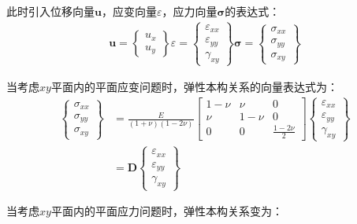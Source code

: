 此时引入位移向量$\pmb{u}$，应变向量$\varepsilon$，应力向量$\pmb{\sigma}$的表达式：
\begin{equation}
\begin{split}
    \pmb{u}=\left\{\begin{matrix} u_x\\u_y\end{matrix}\right\}
    \varepsilon=\left\{\begin{matrix}
        \varepsilon_{xx}\\\varepsilon_{yy}\\\gamma_{xy}
    \end{matrix}\right\}
    \pmb{\sigma}=\left\{\begin{matrix}
        \sigma_{xx}\\\sigma_{yy}\\\sigma_{xy}
    \end{matrix}\right\}
\end{split}
\end{equation}\par
当考虑$xy$平面内的平面应变问题时，弹性本构关系的向量表达式为：
\begin{equation}
\begin{split}
    \left\{\begin{matrix}
        \sigma_{xx}\\\sigma_{yy}\\\sigma_{xy}
    \end{matrix}\right\}&=\frac{E}{(1+\nu)(1-2\nu)}
    \left[\begin{matrix}
        1-\nu&\nu&0\\\nu&1-\nu&0\\0&0&\frac{1-2\nu}{2}
    \end{matrix}\right]
    \left\{\begin{matrix}
        \varepsilon_{xx}\\\varepsilon_{yy}\\\gamma_{xy}
    \end{matrix}\right\}\\
    &=\pmb{D}\left\{\begin{matrix}\varepsilon_{xx}\\\varepsilon_{yy}\\\gamma_{xy}\end{matrix}\right\}
\end{split}
\end{equation}\par
当考虑$xy$平面内的平面应力问题时，弹性本构关系变为：
